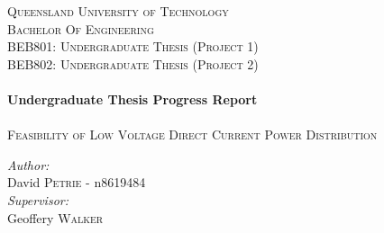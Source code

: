 \begin{titlepage}



\center %
 

\textsc{\LARGE Queensland University of Technology}\\[1.5cm] %
\textsc{\Large Bachelor Of Engineering}\\[0.5cm] %
\textsc{\large BEB801: Undergraduate Thesis (Project 1)}\\[0.5cm] %
\textsc{\large BEB802: Undergraduate Thesis (Project 2)}\\[0.5cm]

\HRule \\[0.5cm]
{ \huge \bfseries Undergraduate Thesis Progress Report}\\[0.4cm] %
\HRule \\[2cm]
 
 

\textsc{\Large Feasibility of Low Voltage Direct Current Power Distribution}\\[4cm] 


\begin{minipage}{0.4\textwidth}
\begin{center} \large
\emph{Author:}\\
David \textsc{Petrie} - n8619484 \\[1cm]
\emph{Supervisor:}\\
Geoffery \textsc{Walker}\\
\end{center}
\end{minipage}
\\[1.5cm]


\end{titlepage}
